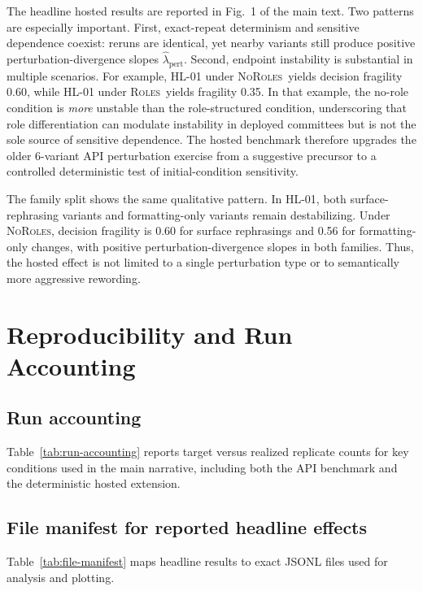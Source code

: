 \documentclass[11pt,onecolumn]{article}
\newcommand{\Roles}{\textsc{Roles}}
\newcommand{\NoRoles}{\textsc{NoRoles}}
\begin{document}
The headline hosted results are reported in Fig.~1 of the main text. Two
patterns are especially important. First, exact-repeat determinism and
sensitive dependence coexist: reruns are identical, yet nearby variants still
produce positive perturbation-divergence slopes
$\hat{\lambda}_{\mathrm{pert}}$. Second, endpoint instability is substantial in
multiple scenarios. For example, HL-01 under \NoRoles\ yields decision
fragility 0.60, while HL-01 under \Roles\ yields fragility 0.35. In that
example, the no-role condition is \emph{more} unstable than the role-structured
condition, underscoring that role differentiation can modulate instability in
deployed committees but is not the sole source of sensitive dependence. The
hosted benchmark therefore upgrades the older 6-variant API
perturbation exercise from a suggestive precursor to a controlled deterministic
test of initial-condition sensitivity.

The family split shows the same qualitative pattern. In HL-01, both
surface-rephrasing variants and formatting-only variants remain destabilizing.
Under \NoRoles, decision fragility is 0.60 for surface rephrasings and 0.56
for formatting-only changes, with positive perturbation-divergence slopes in
both families. Thus, the hosted effect is not limited to a single perturbation
type or to semantically more aggressive rewording.

\section{Reproducibility and Run Accounting}
\label{sec:S5-repro}

\subsection{Run accounting}

Table~\ref{tab:run-accounting} reports target versus realized replicate counts
for key conditions used in the main narrative, including both the API
benchmark and the deterministic hosted extension.

\subsection{File manifest for reported headline effects}

Table~\ref{tab:file-manifest} maps headline results to exact JSONL files used
for analysis and plotting.
\end{document}
